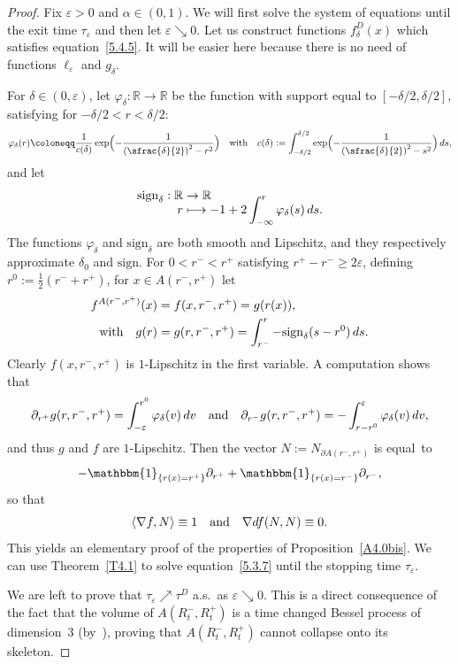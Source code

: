 \documentclass[10pt]{amsart}
\newcommand\mto{\mathchoice{\longmapsto}{\mapsto}{\mapsto}{\mapsto}}
\theoremstyle{plain}
\theoremstyle{definition}
\newcommand{\RR}{{\mathbb R}}
\newcommand\df{\coloneqq}
\newcommand{\sign}{\mathrm{sign}}
\newcommand{\un}{\mathbbm{1}}
\let\di\displaystyle
\let\f\frac
\let\a\alpha
\let\d\delta
\let\e\varepsilon
\let\n\nabla
\begin{document}
\begin{proof}
Fix $\e>0$ and $\a\in (0,1)$. We will first solve the system of equations until the exit time $\tau_\e$ and then let $\e\searrow 0$. Let us construct functions $f_\d^D(x)$ which satisfies equation~\eqref{5.4.5}. It will be easier here because there is no need of functions $\ell_\e$ and $g_\d$.

For $\d\in (0,\e)$, let $\varphi_\d:\RR\to \RR$ be the function with support equal to $[-\d/2,\d/2]$, satisfying for $-\d/2<r<\d/2$:
\begin{equation}
\varphi_\d (r)\df \f1{c(\d)}\exp\Bigl(-\f1{\left(\sfrac{\d}{2}\right)^2-r^2}\Bigr)\quad \hbox{with}\quad c(\d):=\int_{-\d/2}^{\d/2}\exp\Bigl(-\f1{\left(\sfrac{\d}{2}\right)^2-s^2}\Bigr)\,ds,
\end{equation}
and let
\begin{equation}
\begin{split}
\sign_\d: \RR&\to\RR\\[-10pt]
r&\mto -1+2\int_{-\infty}^r\varphi_\d(s)\,ds.
\end{split}
\end{equation}
The functions $\varphi_\d$ and $\sign_\d$ are both smooth and Lipschitz, and they respectively approximate $\d_0$ and $\sign$. For $0<r^-<r^+$ satisfying $r^+-r^-\ge 2\e$, defining \hbox{$\di r^0:=\tfrac12(r^-+r^+)$}, for $x\in A(r^-,r^+)$ let
\begin{equation}
\begin{split}
f^{A(r^-,r^+)}(x)&=f(x,r^-,r^+)=g(r(x)),\\
\hbox{with}\quad g(r)&=g(r,r^-,r^+)=\int_{r^-}^{r} -\sign_\d(s-r^0)\, ds.
\end{split}
\end{equation}
Clearly $f(x,r^-, r^+)$ is $1$-Lipschitz in the first variable. A computation shows that
\begin{equation}
\partial_{r^+}g(r,r^-,r^+)=\int_{-\e}^{r^0}\varphi_\d(v)\,dv\quad \hbox{and}\quad \partial_{r^-}g(r,r^-,r^+)=-\int_{r-r^0}^{\e}\varphi_\d(v)\,dv,
\end{equation}
and thus $g$ and $f$ are $1$-Lipschitz. Then the vector $N:=N_{\partial A(r^-,r^+)}$ is equal~to
\[
-\un_{\{r(x)=r^+\}}\partial_{r^+}+\un_{\{r(x)=r^-\}}\partial_{r^-},
\]
so that
\begin{equation}
\langle \n f, N\rangle \equiv 1\quad \hbox{and}\quad \n df(N,N)\equiv 0.
\end{equation}
This yields an elementary proof of the properties of Proposition~\ref{A4.0bis}. We can use Theorem~\ref{T4.1} to solve equation~\eqref{5.3.7} until the stopping time $\tau_\e$.

We are left to prove that $\tau_\e\nearrow \tau^D$ a.s.\ as $\e\searrow 0$. This is a direct consequence of the fact that the volume of $A(R_t^-,R_t^+)$ is a time changed Bessel process of dimension~$3$ (by~\cite[Th.\,5]{zbMATH07470497}), proving that $A(R_t^-,R_t^+)$ cannot collapse onto its skeleton.
\end{proof}
\end{document}
